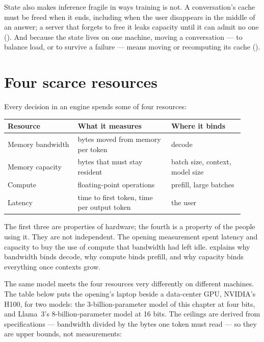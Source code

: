 State also makes inference fragile in ways training is not. A conversation's
cache must be freed when it ends, including when the user disappears in the
middle of an answer; a server that forgets to free it leaks capacity until it
can admit no one (). And because the state lives on one
machine, moving a conversation --- to balance load, or to survive a failure ---
means moving or recomputing its cache ().

\section{Four scarce resources}

Every decision in an engine spends some of four resources:

\begin{center}
\begin{tabular}{@{}p{0.27\linewidth}p{0.36\linewidth}p{0.29\linewidth}@{}}
\toprule
Resource & What it measures & Where it binds \\
\midrule
Memory bandwidth & bytes moved from memory per token & decode \\
Memory capacity & bytes that must stay resident & batch size, context, model size \\
Compute & floating-point operations & prefill, large batches \\
Latency & time to first token, time per output token & the user \\
\bottomrule
\end{tabular}
\end{center}

The first three are properties of hardware; the fourth is a property of the
people using it. They are not independent. The opening measurement spent
latency and capacity to buy the use of compute that bandwidth had left idle.
 explains why bandwidth binds decode, 
why compute binds prefill, and  why capacity binds everything
once contexts grow.

The same model meets the four resources very differently on different
machines. The table below puts the opening's laptop beside a data-center GPU,
NVIDIA's H100, for two models: the 3-billion-parameter model of this chapter at
four bits, and Llama~3's 8-billion-parameter model at 16 bits. The ceilings are
derived from specifications --- bandwidth divided by the bytes one token must
read --- so they are upper bounds, not measurements:

